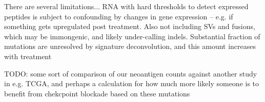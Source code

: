 There are several limitations... RNA with hard thresholds to detect expressed peptides is subject to confounding by changes in gene expression -- e.g. if something gets upregulated post treatment. Also not including SVs and fusions, which may be immongenic, and likely under-calling indels. Substantial fraction of mutations are unresolved by signature deconvolution, and this amount increases with treatment

TODO: some sort of comparison of our neoantigen counts against another study in e.g. TCGA, and perhaps a calculation for how much more likely someone is to benefit from chekcpoint blockade based on these mutations


